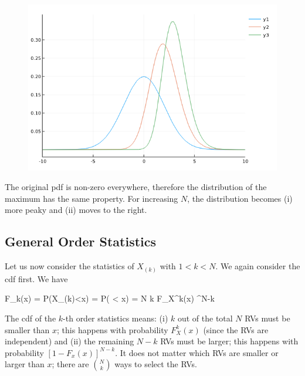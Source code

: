 \begin{figure}[H]
	\centering
	\includegraphics[scale=0.7]{images/order_stat_1_1.png}
\end{figure}

The original pdf is non-zero everywhere, therefore the distribution of the maximum has the same property. For increasing $N$, the distribution becomes (i) more peaky and (ii) moves to the right.



\subsection{General Order Statistics}

Let us now consider the statistics of $X_{(k)}$ with $1 < k < N$. We again consider the cdf first. We have

\bee
F_k(x) = P(X_{(k)}<x) = P( < x) = {N \choose k} F_X^k(x) \left[ 1 - F_x(x) \right]^{N-k}
\eee

The cdf of the $k$-th order statistics means: (i) $k$ out of the total $N$ RVs must be smaller than $x$; this happens with probability $F_X^k(x)$ (since the RVs are independent) and (ii) the remaining $N-k$ RVs must be larger; this happens with probability $\left[ 1 - F_x(x) \right]^{N-k}$. It does not matter which RVs are smaller or larger than $x$; there are ${N \choose k}$ ways to select the RVs.

